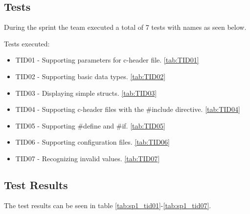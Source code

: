 \subsection{Tests}
During the sprint the team executed a total of 7 tests with names as seen
below.

\noindent Tests executed:
\begin{itemize}
\item TID01 - Supporting parameters for c-header file. \autoref{tab:TID01}
\item TID02 - Supporting basic data types. \autoref{tab:TID02}
\item TID03 - Displaying simple structs. \autoref{tab:TID03}
\item TID04 - Supporting c-header files with the \#include directive. \autoref{tab:TID04}
\item TID05 - Supporting \#define and \#if. \autoref{tab:TID05}
\item TID06 - Supporting configuration files. \autoref{tab:TID06}
\item TID07 - Recognizing invalid values. \autoref{tab:TID07}
\end{itemize}

\subsection{Test Results}
The test results can be seen in table \ref{tab:sp1_tid01}-\ref{tab:sp1_tid07}.
\begin{table}[!htb] \footnotesize \center
\caption{Supporting parameters for c-header file \label{tab:sp1_tid01}}
\noindent{}
\end{table}

\begin{table}[!htb] \footnotesize \center
\caption{Supporting basic data types \label{tab:sp1_tid02}}
\noindent{}
\end{table}

